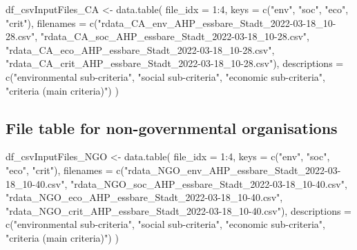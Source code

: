 \documentclass[
]{article}
\newenvironment{Shaded}{\begin{snugshade}}{\end{snugshade}}
\newcommand{\AttributeTok}[1]{\textcolor[rgb]{0.00,0.34,0.68}{#1}}
\newcommand{\DecValTok}[1]{\textcolor[rgb]{0.69,0.50,0.00}{#1}}
\newcommand{\FunctionTok}[1]{\textcolor[rgb]{0.39,0.29,0.61}{#1}}
\newcommand{\NormalTok}[1]{\textcolor[rgb]{0.12,0.11,0.11}{#1}}
\newcommand{\OtherTok}[1]{\textcolor[rgb]{0.00,0.43,0.16}{#1}}
\newcommand{\SpecialCharTok}[1]{\textcolor[rgb]{0.24,0.68,0.91}{#1}}
\newcommand{\StringTok}[1]{\textcolor[rgb]{0.75,0.01,0.01}{#1}}
\begin{document}
\begin{Shaded}
\begin{Highlighting}[]
\NormalTok{df\_csvInputFiles\_CA }\OtherTok{\textless{}{-}} \FunctionTok{data.table}\NormalTok{(}
  \AttributeTok{file\_idx =} \DecValTok{1}\SpecialCharTok{:}\DecValTok{4}\NormalTok{,}
  \AttributeTok{keys =} \FunctionTok{c}\NormalTok{(}\StringTok{"env"}\NormalTok{, }\StringTok{"soc"}\NormalTok{, }\StringTok{"eco"}\NormalTok{, }\StringTok{"crit"}\NormalTok{),}
  \AttributeTok{filenames =} \FunctionTok{c}\NormalTok{(}\StringTok{"rdata\_CA\_env\_AHP\_essbare\_Stadt\_2022{-}03{-}18\_10{-}28.csv"}\NormalTok{,}
                \StringTok{"rdata\_CA\_soc\_AHP\_essbare\_Stadt\_2022{-}03{-}18\_10{-}28.csv"}\NormalTok{,}
                \StringTok{"rdata\_CA\_eco\_AHP\_essbare\_Stadt\_2022{-}03{-}18\_10{-}28.csv"}\NormalTok{,}
                \StringTok{"rdata\_CA\_crit\_AHP\_essbare\_Stadt\_2022{-}03{-}18\_10{-}28.csv"}\NormalTok{),}
  \AttributeTok{descriptions =} \FunctionTok{c}\NormalTok{(}\StringTok{"environmental sub{-}criteria"}\NormalTok{,}
                   \StringTok{"social sub{-}criteria"}\NormalTok{,}
                   \StringTok{"economic sub{-}criteria"}\NormalTok{,}
                   \StringTok{"criteria (main criteria)"}\NormalTok{)}
\NormalTok{)}
\end{Highlighting}
\end{Shaded}

\hypertarget{file-table-for-non-governmental-organisations}{%
\subsection{File table for non-governmental
organisations}\label{file-table-for-non-governmental-organisations}}

\begin{Shaded}
\begin{Highlighting}[]
\NormalTok{df\_csvInputFiles\_NGO }\OtherTok{\textless{}{-}} \FunctionTok{data.table}\NormalTok{(}
  \AttributeTok{file\_idx =} \DecValTok{1}\SpecialCharTok{:}\DecValTok{4}\NormalTok{,}
  \AttributeTok{keys =} \FunctionTok{c}\NormalTok{(}\StringTok{"env"}\NormalTok{, }\StringTok{"soc"}\NormalTok{, }\StringTok{"eco"}\NormalTok{, }\StringTok{"crit"}\NormalTok{),}
  \AttributeTok{filenames =} \FunctionTok{c}\NormalTok{(}\StringTok{"rdata\_NGO\_env\_AHP\_essbare\_Stadt\_2022{-}03{-}18\_10{-}40.csv"}\NormalTok{,}
                \StringTok{"rdata\_NGO\_soc\_AHP\_essbare\_Stadt\_2022{-}03{-}18\_10{-}40.csv"}\NormalTok{,}
                \StringTok{"rdata\_NGO\_eco\_AHP\_essbare\_Stadt\_2022{-}03{-}18\_10{-}40.csv"}\NormalTok{,}
                \StringTok{"rdata\_NGO\_crit\_AHP\_essbare\_Stadt\_2022{-}03{-}18\_10{-}40.csv"}\NormalTok{),}
  \AttributeTok{descriptions =} \FunctionTok{c}\NormalTok{(}\StringTok{"environmental sub{-}criteria"}\NormalTok{,}
                   \StringTok{"social sub{-}criteria"}\NormalTok{,}
                   \StringTok{"economic sub{-}criteria"}\NormalTok{,}
                   \StringTok{"criteria (main criteria)"}\NormalTok{)}
\NormalTok{)}
\end{Highlighting}
\end{Shaded}
\end{document}
